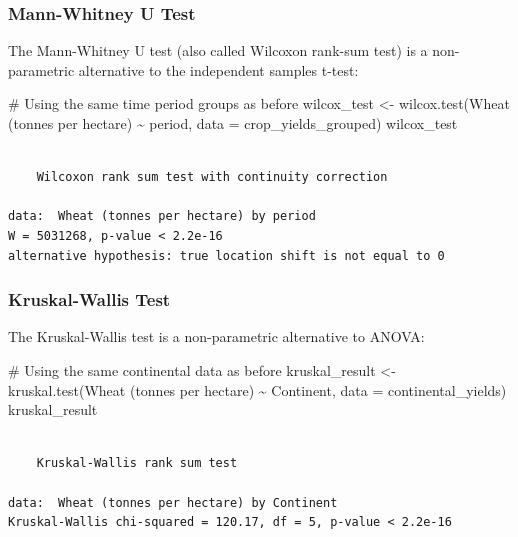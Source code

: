 \documentclass[
  letterpaper,
]{book}
\newenvironment{Shaded}{\begin{snugshade}}{\end{snugshade}}
\newcommand{\AttributeTok}[1]{\textcolor[rgb]{0.40,0.45,0.13}{#1}}
\newcommand{\CommentTok}[1]{\textcolor[rgb]{0.37,0.37,0.37}{#1}}
\newcommand{\FunctionTok}[1]{\textcolor[rgb]{0.28,0.35,0.67}{#1}}
\newcommand{\NormalTok}[1]{\textcolor[rgb]{0.00,0.23,0.31}{#1}}
\newcommand{\OtherTok}[1]{\textcolor[rgb]{0.00,0.23,0.31}{#1}}
\newcommand{\SpecialCharTok}[1]{\textcolor[rgb]{0.37,0.37,0.37}{#1}}
\newcommand{\StringTok}[1]{\textcolor[rgb]{0.13,0.47,0.30}{#1}}
\begin{document}
\subsubsection{Mann-Whitney U Test}\label{mann-whitney-u-test}

The Mann-Whitney U test (also called Wilcoxon rank-sum test) is a
non-parametric alternative to the independent samples t-test:

\begin{Shaded}
\begin{Highlighting}[]
\CommentTok{\# Using the same time period groups as before}
\NormalTok{wilcox\_test }\OtherTok{\textless{}{-}} \FunctionTok{wilcox.test}\NormalTok{(}\StringTok{\textasciigrave{}}\AttributeTok{Wheat (tonnes per hectare)}\StringTok{\textasciigrave{}} \SpecialCharTok{\textasciitilde{}}\NormalTok{ period, }\AttributeTok{data =}\NormalTok{ crop\_yields\_grouped)}
\NormalTok{wilcox\_test}
\end{Highlighting}
\end{Shaded}

\begin{verbatim}

    Wilcoxon rank sum test with continuity correction

data:  Wheat (tonnes per hectare) by period
W = 5031268, p-value < 2.2e-16
alternative hypothesis: true location shift is not equal to 0
\end{verbatim}

\subsubsection{Kruskal-Wallis Test}\label{kruskal-wallis-test}

The Kruskal-Wallis test is a non-parametric alternative to ANOVA:

\begin{Shaded}
\begin{Highlighting}[]
\CommentTok{\# Using the same continental data as before}
\NormalTok{kruskal\_result }\OtherTok{\textless{}{-}} \FunctionTok{kruskal.test}\NormalTok{(}\StringTok{\textasciigrave{}}\AttributeTok{Wheat (tonnes per hectare)}\StringTok{\textasciigrave{}} \SpecialCharTok{\textasciitilde{}}\NormalTok{ Continent, }\AttributeTok{data =}\NormalTok{ continental\_yields)}
\NormalTok{kruskal\_result}
\end{Highlighting}
\end{Shaded}

\begin{verbatim}

    Kruskal-Wallis rank sum test

data:  Wheat (tonnes per hectare) by Continent
Kruskal-Wallis chi-squared = 120.17, df = 5, p-value < 2.2e-16
\end{verbatim}
\end{document}
